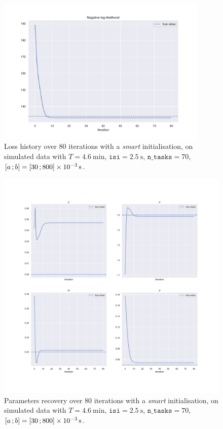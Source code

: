 \begin{figure}[h!]
    \centering
    \includegraphics[width=0.9\textwidth]{pics/results/history_loss_simu_sample.pdf}
    \caption{Loss history over 80 iterations with a \textit{smart} initialisation, on simulated data with $T = \SI{4.6}{\minute}$, $\texttt{isi}=\SI{2.5}{\second}$, $\texttt{n\_tasks} = 70$, $\left[ a \, ; b \right] = \left[ 30 \, ; 800 \right]\times \SI{e-3}{\second}$.}
    \label{fig:history_loss_2}
\end{figure}

\begin{figure}[h!]
    \centering
    \includegraphics[width=\textwidth]{pics/results/history_params_simu_sample.pdf}
    \caption{Parameters recovery over 80 iterations with a \textit{smart} initialisation, on simulated data with $T = \SI{4.6}{\minute}$, $\texttt{isi}=\SI{2.5}{\second}$, $\texttt{n\_tasks} = 70$, $\left[ a \, ; b \right] = \left[ 30 \, ; 800 \right]\times \SI{e-3}{\second}$.}
    \label{fig:history_params_2}
\end{figure}

